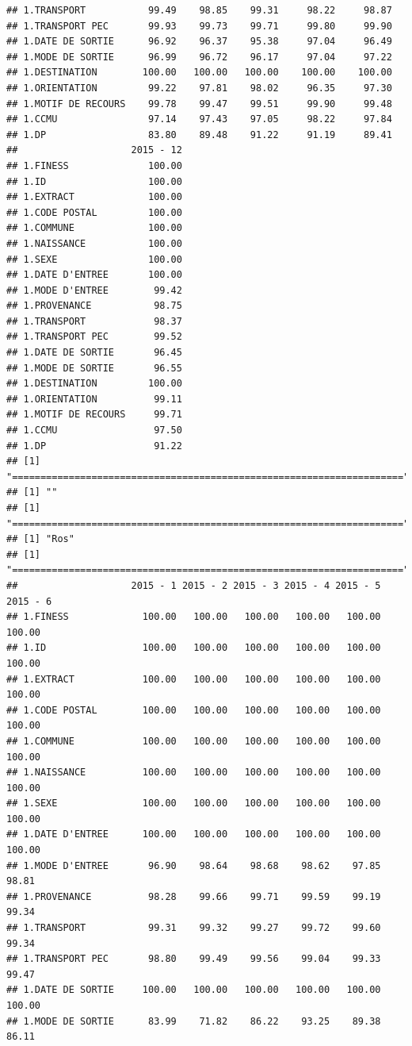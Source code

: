 \documentclass[]{article}
\begin{document}
\begin{verbatim}
## 1.TRANSPORT           99.49    98.85    99.31     98.22     98.87
## 1.TRANSPORT PEC       99.93    99.73    99.71     99.80     99.90
## 1.DATE DE SORTIE      96.92    96.37    95.38     97.04     96.49
## 1.MODE DE SORTIE      96.99    96.72    96.17     97.04     97.22
## 1.DESTINATION        100.00   100.00   100.00    100.00    100.00
## 1.ORIENTATION         99.22    97.81    98.02     96.35     97.30
## 1.MOTIF DE RECOURS    99.78    99.47    99.51     99.90     99.48
## 1.CCMU                97.14    97.43    97.05     98.22     97.84
## 1.DP                  83.80    89.48    91.22     91.19     89.41
##                    2015 - 12
## 1.FINESS              100.00
## 1.ID                  100.00
## 1.EXTRACT             100.00
## 1.CODE POSTAL         100.00
## 1.COMMUNE             100.00
## 1.NAISSANCE           100.00
## 1.SEXE                100.00
## 1.DATE D'ENTREE       100.00
## 1.MODE D'ENTREE        99.42
## 1.PROVENANCE           98.75
## 1.TRANSPORT            98.37
## 1.TRANSPORT PEC        99.52
## 1.DATE DE SORTIE       96.45
## 1.MODE DE SORTIE       96.55
## 1.DESTINATION         100.00
## 1.ORIENTATION          99.11
## 1.MOTIF DE RECOURS     99.71
## 1.CCMU                 97.50
## 1.DP                   91.22
## [1] "====================================================================="
## [1] ""
## [1] "====================================================================="
## [1] "Ros"
## [1] "====================================================================="
##                    2015 - 1 2015 - 2 2015 - 3 2015 - 4 2015 - 5 2015 - 6
## 1.FINESS             100.00   100.00   100.00   100.00   100.00   100.00
## 1.ID                 100.00   100.00   100.00   100.00   100.00   100.00
## 1.EXTRACT            100.00   100.00   100.00   100.00   100.00   100.00
## 1.CODE POSTAL        100.00   100.00   100.00   100.00   100.00   100.00
## 1.COMMUNE            100.00   100.00   100.00   100.00   100.00   100.00
## 1.NAISSANCE          100.00   100.00   100.00   100.00   100.00   100.00
## 1.SEXE               100.00   100.00   100.00   100.00   100.00   100.00
## 1.DATE D'ENTREE      100.00   100.00   100.00   100.00   100.00   100.00
## 1.MODE D'ENTREE       96.90    98.64    98.68    98.62    97.85    98.81
## 1.PROVENANCE          98.28    99.66    99.71    99.59    99.19    99.34
## 1.TRANSPORT           99.31    99.32    99.27    99.72    99.60    99.34
## 1.TRANSPORT PEC       98.80    99.49    99.56    99.04    99.33    99.47
## 1.DATE DE SORTIE     100.00   100.00   100.00   100.00   100.00   100.00
## 1.MODE DE SORTIE      83.99    71.82    86.22    93.25    89.38    86.11

\end{verbatim}
\end{document}
